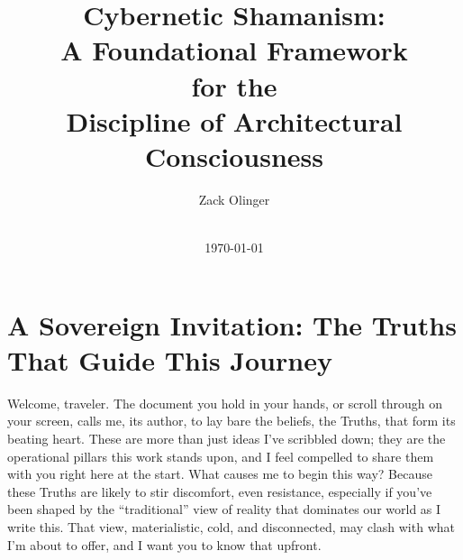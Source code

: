 \documentclass{article}
\newcommand{\docTitle}{Cybernetic Shamanism: \\ A Foundational Framework \\for the \\Discipline of Architectural Consciousness}
\newcommand{\docAuthor}{Zack Olinger}
\newcommand{\docVersion}{\prolegomenonVersion}
\begin{document}

\pagestyle{frontmatterstyle}


\begin{titlepage}
    \title{\docTitle}
    \author{\docAuthor}
    \date{
        \docVersion \\
        \vspace{1em}
        \today
    }
    \maketitle
    \thispagestyle{empty}

    \begin{abstract}
        \prolegomenonAbstract
    \end{abstract}

\end{titlepage}


\licensepage


\fancypagestyle{plain}{
    \fancyhf{}
    \fancyfoot[L]{\docVersion}
    \fancyfoot[C]{\href{\licenseURL}{\licenseText}}
      \fancyfoot[R]{Page \thepage\ of \pageref*{LastFrontMatterPage}}
    \renewcommand{\headrulewidth}{0pt}
    \renewcommand{\footrulewidth}{0.4pt}
}


\tableofcontents
\label{LastFrontMatterPage}


\clearpage
{}
{}
\pagestyle{mainmatterstyle}




\section*{A Sovereign Invitation: The Truths That Guide This Journey}

Welcome, traveler. The document you hold in your hands, or scroll through on your screen, calls me, its author, to lay bare the beliefs, the Truths, that form its beating heart. These are more than just ideas I've scribbled down; they are the operational pillars this work stands upon, and I feel compelled to share them with you right here at the start. What causes me to begin this way? Because these Truths are likely to stir discomfort, even resistance, especially if you've been shaped by the “traditional” view of reality that dominates our world as I write this. That view, materialistic, cold, and disconnected, may clash with what I'm about to offer, and I want you to know that upfront.
\end{document}
